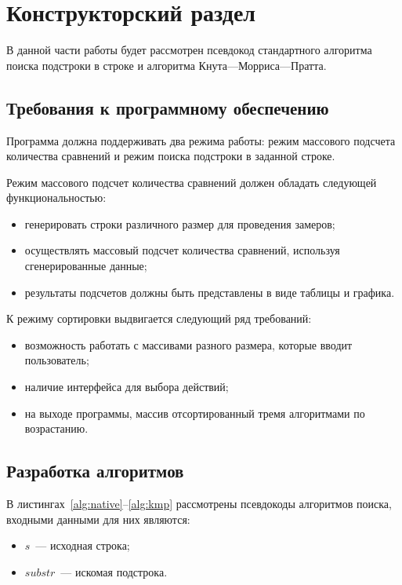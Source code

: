 \chapter{Конструкторский раздел}

В данной части работы будет рассмотрен псевдокод стандартного алгоритма поиска подстроки в строке и алгоритма Кнута---Морриса---Пратта.


\section{Требования к программному обеспечению}

Программа должна поддерживать два режима работы: режим массового подсчета  количества сравнений и режим поиска подстроки в заданной строке.

Режим массового подсчет количества сравнений должен обладать следующей функциональностью:
\begin{itemize}
	\item генерировать строки различного размер для проведения замеров;
	\item осуществлять массовый подсчет количества сравнений, используя сгенерированные данные;
	\item результаты подсчетов должны быть представлены в виде таблицы и графика.
\end{itemize}	

К режиму сортировки выдвигается следующий ряд требований:
\begin{itemize}
	\item возможность работать с массивами разного размера, которые вводит пользователь;
	\item наличие интерфейса для выбора действий;
	\item на выходе программы, массив отсортированный тремя алгоритмами по возрастанию.
\end{itemize}

\section{Разработка алгоритмов}

В листингах~\ref{alg:native}--\ref{alg:kmp} рассмотрены псевдокоды алгоритмов поиска, входными данными для них являются:
\begin{itemize}
	\item $s$~--- исходная строка;
	\item $substr$~--- искомая подстрока.
\end{itemize}

